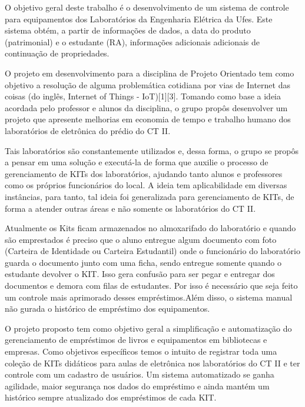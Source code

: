 \vspace{-42pt}
O objetivo geral deste trabalho é o desenvolvimento de um sistema de controle para equipamentos dos Laboratórios da Engenharia Elétrica da Ufes. Este sistema obtém, a partir de informações de dados, a data do produto (patrimonial) e o estudante (RA), informações adicionais adicionais de continuação de propriedades.

O projeto em desenvolvimento para a disciplina de Projeto Orientado tem como objetivo a resolução de alguma problemática cotidiana por vias de Internet das coisas (do inglês, Internet of Things - IoT)[1][3]. Tomando como base a ideia acordada pelo professor e alunos da disciplina, o grupo propôs desenvolver um projeto que apresente melhorias em economia de tempo e trabalho humano dos laboratórios de eletrônica do prédio do CT II. 

Tais laboratórios são constantemente utilizados e, dessa forma, o grupo se propôs a pensar em uma solução e executá-la de forma que auxilie o processo de gerenciamento de KITs dos laboratórios, ajudando tanto alunos e professores como os próprios funcionários do local. A ideia tem aplicabilidade em diversas instâncias, para tanto, tal ideia foi generalizada para gerenciamento de KITs, de forma a atender outras áreas e não somente os laboratórios do CT II. 

Atualmente os Kits ficam armazenados no almoxarifado do laboratório e quando são emprestados é preciso que o aluno entregue algum documento com foto (Carteira de Identidade ou Carteira Estudantil) onde o funcionário do laboratório guarda o documento junto com uma ficha, sendo entregue somente quando o estudante devolver o KIT. Isso gera confusão para ser pegar e entregar dos documentos e demora com filas de estudantes. Por isso é necessário que seja feito um controle mais aprimorado desses empréstimos.Além disso, o sistema manual não gurada o histórico de empréstimo dos equipamentos. 

O projeto proposto tem como objetivo geral a simplificação e automatização do gerenciamento de empréstimos de livros e equipamentos em bibliotecas e empresas. Como objetivos específicos temos o intuito de registrar toda uma coleção de KITs didáticos para aulas de eletrônica nos laboratórios do CT II e ter controle com um cadastro de usuários.
Um sistema automatizado se ganha agilidade, maior segurança nos dados do empréstimo e ainda mantém um histórico sempre atualizado dos empréstimos de cada KIT.



